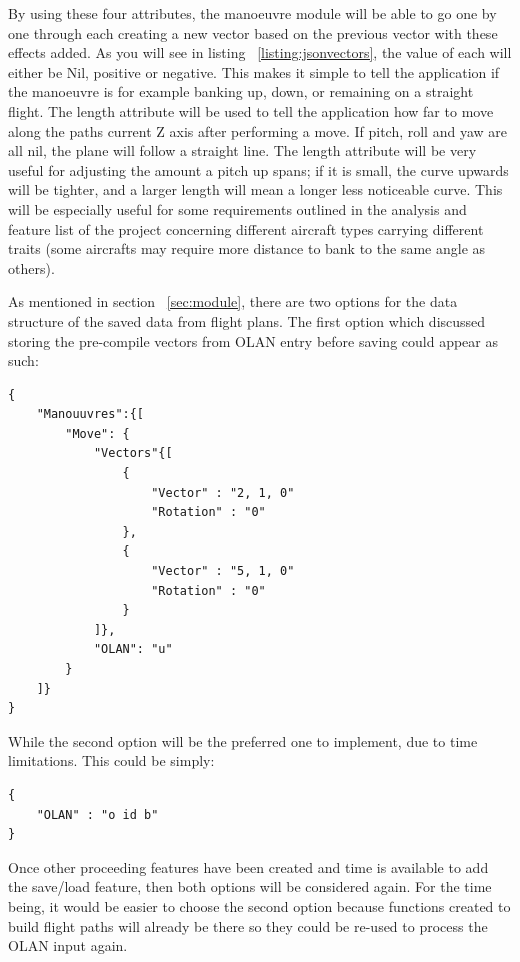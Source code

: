 By using these four attributes, the manoeuvre module will be able to go one by one through each creating a new vector based on the previous vector with these effects added. As you will see in listing ~\ref{listing:jsonvectors}, the value of each will either be Nil, positive or negative. This makes it simple to tell the application if the manoeuvre is for example banking up, down, or remaining on a straight flight. The length attribute will be used to tell the application how far to move along the paths current Z axis after performing a move. If pitch, roll and yaw are all nil, the plane will follow a straight line. The length attribute will be very useful for adjusting the amount a pitch up spans; if it is small, the curve upwards will be tighter, and a larger length will mean a longer less noticeable curve. This will be especially useful for some requirements outlined in the analysis and feature list of the project concerning different aircraft types carrying different traits (some aircrafts may require more distance to bank to the same angle as others).

As mentioned in section ~\ref{sec:module}, there are two options for the data structure of the saved data from flight plans. The first option which discussed storing the pre-compile vectors from OLAN entry before saving could appear as such:

\lstset{language=JavaScript}
\medskip
\begin{lstlisting}[caption=A JSON means of holding break downs of manouvres with each one holding information on different variants of the move such as inverse and reverse and description of the OLAN notation]
{
	"Manouuvres":{[
		"Move": {
			"Vectors"{[
				{
					"Vector" : "2, 1, 0"
					"Rotation" : "0"
				},
				{
					"Vector" : "5, 1, 0"
					"Rotation" : "0"
				}
			]},
			"OLAN": "u"
		}
	]}
}
\end{lstlisting}
\label{listing:jsonvectors}

While the second option will be the preferred one to implement, due to time limitations. This could be simply:

\lstset{language=JavaScript}
\medskip
\begin{lstlisting}[caption=A JSON means of holding break downs of manouvres with each one holding information on different variants of the move such as inverse and reverse and description of the OLAN notation]
{
	"OLAN" : "o id b"
}
\end{lstlisting}

Once other proceeding features have been created and time is available to add the save/load feature, then both options will be considered again. For the time being, it would be easier to choose the second option because functions created to build flight paths will already be there so they could be re-used to process the OLAN input again.

